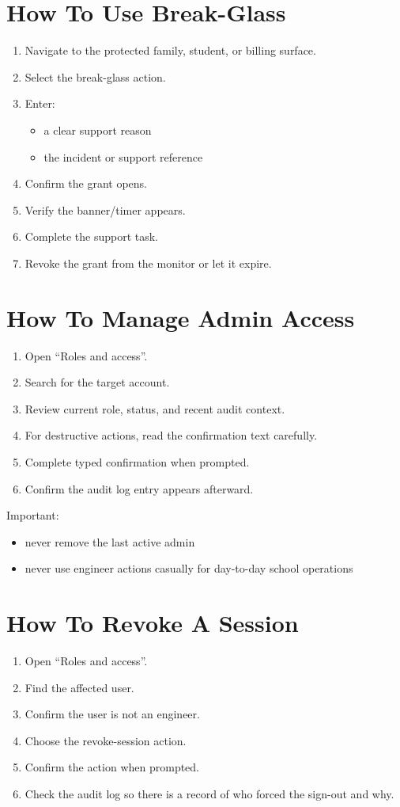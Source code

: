 \documentclass[11pt]{article}
\begin{document}
\section*{How To Use Break-Glass}
\begin{enumerate}
  \item Navigate to the protected family, student, or billing surface.
  \item Select the break-glass action.
  \item Enter:
  \begin{itemize}
    \item a clear support reason
    \item the incident or support reference
  \end{itemize}
  \item Confirm the grant opens.
  \item Verify the banner/timer appears.
  \item Complete the support task.
  \item Revoke the grant from the monitor or let it expire.
\end{enumerate}

\section*{How To Manage Admin Access}
\begin{enumerate}
  \item Open ``Roles and access''.
  \item Search for the target account.
  \item Review current role, status, and recent audit context.
  \item For destructive actions, read the confirmation text carefully.
  \item Complete typed confirmation when prompted.
  \item Confirm the audit log entry appears afterward.
\end{enumerate}

Important:
\begin{itemize}
  \item never remove the last active admin
  \item never use engineer actions casually for day-to-day school operations
\end{itemize}

\section*{How To Revoke A Session}
\begin{enumerate}
  \item Open ``Roles and access''.
  \item Find the affected user.
  \item Confirm the user is not an engineer.
  \item Choose the revoke-session action.
  \item Confirm the action when prompted.
  \item Check the audit log so there is a record of who forced the sign-out and why.
\end{enumerate}
\end{document}
